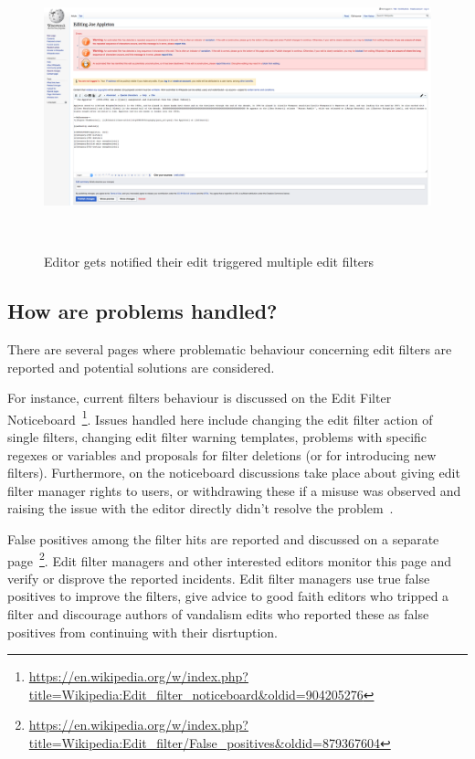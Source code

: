 \begin{figure}
\centering
  \includegraphics[width=0.9\columnwidth]{pics/screenshots-filter-trigger/Screenshot-trigger-warning-filter.png}
  \caption{Editor gets notified their edit triggered multiple edit filters}~\label{fig:screenshot-warn-disallow}
\end{figure}


\subsection{How are problems handled?}

There are several pages where problematic behaviour concerning edit filters are reported and potential solutions are considered.

For instance, current filters behaviour is discussed on the Edit Filter Noticeboard~\footnote{\url{https://en.wikipedia.org/w/index.php?title=Wikipedia:Edit_filter_noticeboard&oldid=904205276}}.
Issues handled here include changing the edit filter action of single filters, changing edit filter warning templates, problems with specific regexes or variables and proposals for filter deletions (or for introducing new filters).
Furthermore, on the noticeboard discussions take place about giving edit filter manager rights to users, or withdrawing these if a misuse was observed and raising the issue with the editor directly didn't resolve the problem~\cite{Wikipedia:EditFilter}.

False positives among the filter hits are reported and discussed on a separate page~\footnote{\url{https://en.wikipedia.org/w/index.php?title=Wikipedia:Edit_filter/False_positives&oldid=879367604}}.
Edit filter managers and other interested editors monitor this page and verify or disprove the reported incidents.
Edit filter managers use true false positives to improve the filters, give advice to good faith editors who tripped a filter and discourage authors of vandalism edits who reported these as false positives from continuing with their disrtuption.

